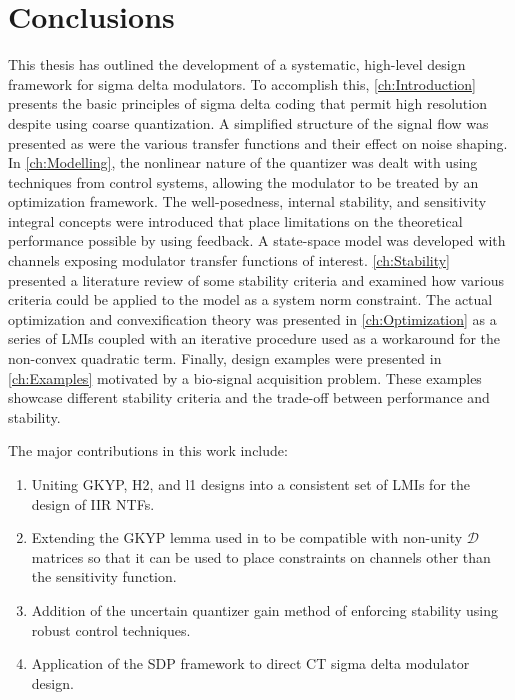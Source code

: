 
\chapter{Conclusions}
\label{ch:Conclusions}

This thesis has outlined the development of a systematic, high-level design framework for sigma delta modulators. To accomplish this, \autoref{ch:Introduction} presents the basic principles of sigma delta coding that permit high resolution despite using coarse quantization. A simplified structure of the signal flow was presented as were the various transfer functions and their effect on noise shaping. In \autoref{ch:Modelling}, the nonlinear nature of the quantizer was dealt with using techniques from control systems, allowing the modulator to be treated by an optimization framework. The well-posedness, internal stability, and sensitivity integral concepts were introduced that place limitations on the theoretical performance possible by using feedback. A state-space model was developed with channels exposing modulator transfer functions of interest. \autoref{ch:Stability} presented a literature review of some stability criteria and examined how various criteria could be applied to the model as a system norm constraint. The actual optimization and convexification theory was presented in \autoref{ch:Optimization} as a series of \gls{LMI}s coupled with an iterative procedure used as a workaround for the non-convex quadratic term. Finally, design examples were presented in \autoref{ch:Examples} motivated by a bio-signal acquisition problem. These examples showcase different stability criteria and the trade-off between performance and stability.

The major contributions in this work include:

\begin{enumerate}
	\item Uniting \gls{GKYP}, \gls{H2}, and \gls{l1} designs into a consistent set of \gls{LMI}s for the design of \gls{IIR} \gls{NTF}s.
	\item Extending the \gls{GKYP} lemma used in \cite{Li2014} to be compatible with non-unity $\mathcal{D}$ matrices so that it can be used to place constraints on channels other than the sensitivity function.
	\item Addition of the uncertain quantizer gain method of enforcing stability using robust control techniques.
	\item Application of the \gls{SDP} framework to direct \gls{CT} sigma delta modulator design.
\end{enumerate}

